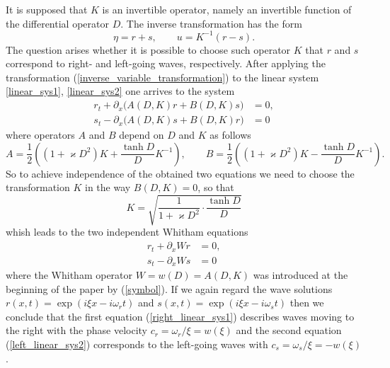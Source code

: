 %
It is supposed that $K$ is an invertible operator,
namely an invertible function of the differential operator $D$.
The inverse transformation has the form
%
\begin{equation}
\label{inverse_variable_transformation}
	\eta = r + s
	, \qquad
	u = K^{-1} (r - s)
	. 
\end{equation}
%
The question arises whether it is possible to choose
such operator $K$ that $r$ and $s$ correspond to
right- and left-going waves, respectively.
After applying the transformation (\ref{inverse_variable_transformation})
to the linear system \eqref{linear_sys1}, \eqref{linear_sys2} one
arrives to the system
%
\begin{align*}
	r_t + \partial _x \big( A(D,K)r + B(D,K)s \big) &= 0
	, \\
	s_t - \partial _x \big( A(D,K)s + B(D,K)r \big) &= 0
\end{align*}
%
where operators $A$ and $B$ depend on $D$ and $K$ as follows
\[
	A = \frac 12 \left( (1 + \varkappa D^2) K + \frac{\tanh D}{D} K^{-1} \right)
	, \qquad
	B = \frac 12 \left( (1 + \varkappa D^2) K - \frac{\tanh D}{D} K^{-1} \right)
	.
\]
%
So to achieve independence of the obtained two equations
we need to choose the transformation $K$ in the way $B(D,K) = 0$,
so that
\begin{equation}
\label{K_transformation}
	K = \sqrt{ \frac{1}{ 1 + \varkappa D^2 } \cdot \frac{\tanh D}{D} }
\end{equation}
%
whish leads to the two independent Whitham equations
%
\begin{align}
\label{right_linear_sys1}
	r_t + \partial _x Wr &= 0
	, \\
\label{left_linear_sys2}
	s_t - \partial _x Ws &= 0
\end{align}
%
where the Whitham operator $W = w(D) = A(D,K)$ was introduced at
the beginning of the paper by (\ref{symbol}).
If we again regard the wave solutions
\(
	r(x, t) = \exp({ i \xi x - i \omega_r t })
\)
and
\(
	s(x, t) = \exp({ i \xi x - i \omega_s t })
\)
then we conclude that the first equation (\ref{right_linear_sys1})
describes waves moving to the right with the phase
velocity $c_r = \omega_r / \xi = w(\xi)$
and the second equation (\ref{left_linear_sys2})
corresponds to the left-going waves with
$c_s = \omega_s / \xi = - w(\xi)$.

